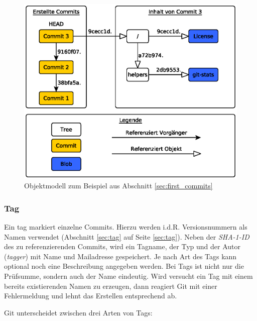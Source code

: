 \begin{figure}
  \centering
  \includegraphics[scale=0.75]{images/objectmodel.eps}
  \caption{Objektmodell zum Beispiel aus Abschnitt \ref{sec:first_commits}\cite[S.~53]{gitosp}}
  \label{fig:objectmodel}
\end{figure}

\subsubsection{Tag}\label{sec:tagobject}
Ein \gls{tag} markiert einzelne Commits. Hierzu werden i.d.R. Versionsnummern
als Namen verwendet (Abschnitt \ref{sec:tag} auf Seite \ref{sec:tag}). Neben
der \textit{SHA-1-ID} des zu referenzierenden Commits, wird ein Tagname, der
Typ und der Autor (\textit{tagger}) mit Name und Mailadresse gespeichert. Je
nach Art des Tags kann optional noch eine Beschreibung angegeben werden. Bei
Tags ist nicht nur die Prüfsumme, sondern auch der Name eindeutig. Wird
versucht ein Tag mit einem bereits existierenden Namen zu erzeugen, dann
reagiert Git mit einer Fehlermeldung und lehnt das Erstellen entsprechend ab. 

Git unterscheidet zwischen drei Arten von Tags:

